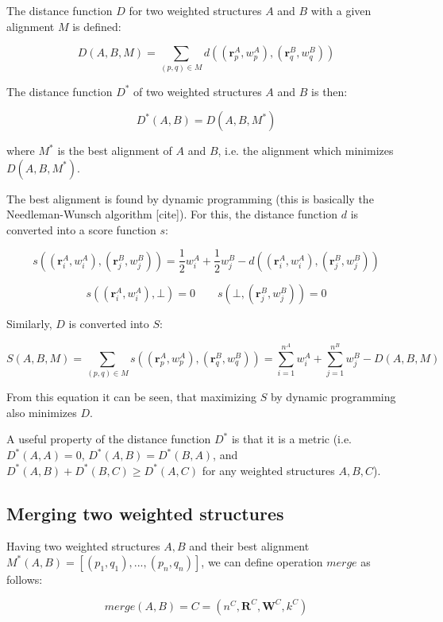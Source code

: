 \documentclass{article}
\begin{document}
The distance function \(D\) for two weighted structures \(A\) and \(B\) with a given alignment \(M\) is defined:

\[  D(A, B, M) = \sum\limits_{(p, q) \in M}{d \left( (\mathbf{r}^A_{p}, w^A_{p}), (\mathbf{r}^B_{q}, w^B_{q}) \right)}  \]

The distance function \(D^*\) of two weighted structures \(A\) and \(B\) is then:

\[  D^*(A, B) = D(A, B, M^*)  \]

where \(M^*\) is the best alignment of \(A\) and \(B\), i.e. the alignment which minimizes \(D(A, B, M^*)\).

The best alignment is found by dynamic programming (this is basically
the Needleman-Wunsch algorithm {[}cite{]}). For this, the distance
function \(d\) is converted into a score function \(s\):

\[
  s \left( (\mathbf{r}^A_i, w^A_i), (\mathbf{r}^B_j, w^B_j) \right) 
  = \frac{1}{2} w^A_i + \frac{1}{2} w^B_j - d \left( (\mathbf{r}^A_i, w^A_i), (\mathbf{r}^B_j, w^B_j) \right)
\]

\[
  s \left( (\mathbf{r}^A_i, w^A_i), \bot \right) = 0 \qquad 
  s \left( \bot, (\mathbf{r}^B_j, w^B_j) \right) = 0
\]

Similarly, \(D\) is converted into \(S\):

\[
  S(A, B, M) 
  = \sum\limits_{(p, q) \in M}{s \left( (\mathbf{r}^A_{p}, w^A_{p}), (\mathbf{r}^B_{q}, w^B_{q}) \right)}
  = \sum\limits_{i=1}^{n^A}{w^A_i} + \sum\limits_{j=1}^{n^B}{w^B_j} - D(A, B, M)
\]

From this equation it can be seen, that maximizing \(S\) by dynamic
programming also minimizes \(D\).

A useful property of the distance function \(D^*\) is that it is a
metric (i.e.~\(D^*(A,A) = 0\), \(D^*(A,B) = D^*(B,A)\), and
\(D^*(A,B) + D^*(B,C) \geq D^*(A,C)\) for any weighted structures
\(A, B, C\)).



\subsection{Merging two weighted structures}

Having two weighted structures \(A, B\) and their best alignment
\(M^*(A, B) = [(p_1, q_1), ..., (p_n, q_n)]\), we can define operation
\(merge\) as follows:

\[  merge(A, B) = C = (n^C, \mathbf{R}^C, \mathbf{W}^C, k^C)  \]
\end{document}
